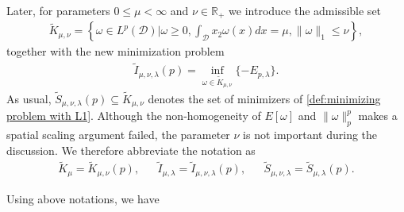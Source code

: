 \documentclass[11pt,letterpaper]{amsart}
\theoremstyle{definition}
\theoremstyle{remark}
\newcommand{\D}{\mathcal{D}}
\newcommand{\R}{\mathbb{R}}
\numberwithin{equation}{section}
\begin{document}
\rightline{$\Box$}

Later, for parameters $0\le\mu<\infty$ and $\nu\in\R_+$ we introduce the admissible set
\begin{align*}
    \widetilde{K}_{\mu,\nu}=\left\{\omega\in L^p(\D) \big| \omega\geq0, \int_{\D}x_2\omega(x)dx=\mu, \|\omega\|_1\leq \nu \right\},
\end{align*}
together with the new minimization problem
\begin{align}
    \widetilde{I}_{\mu, \nu, \lambda}(p)=\inf_{\omega \in \widetilde{K}_{\mu,\nu}}\{-E_{p,\lambda}\}. \label{def:minimizing problem with L1}
\end{align}
As usual, $\widetilde{S}_{\mu, \nu, \lambda}(p) \subseteq \widetilde{K}_{\mu,\nu}$ denotes the set of minimizers of \eqref{def:minimizing problem with L1}. Although the non‑homogeneity of $E[\omega]$ and $\|\omega\|_p^p$ makes a spatial scaling argument failed, the parameter $\nu$ is not important during the discussion. We therefore abbreviate the notation as 
\begin{align*}
    \widetilde{K}_{\mu}=\widetilde{K}_{\mu,\nu}(p), && 
    \widetilde{I}_{\mu,\lambda}=\widetilde{I}_{\mu, \nu,\lambda}(p), && 
    \widetilde{S}_{\mu, \nu, \lambda} = \widetilde{S}_{\mu, \lambda}(p).
\end{align*}

Using above notations, we have
\end{document}
